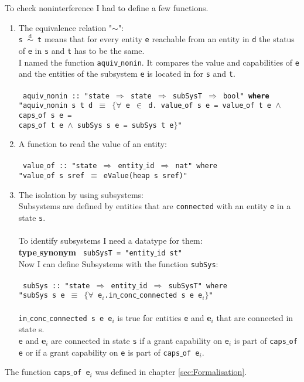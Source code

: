 To check noninterference I had to define a few functions. \\
	
\begin{enumerate}
	
\item The equivalence relation "$\sim$": \\
\texttt{s $\overset{\text{d}}{\sim}$ t} means that for every entity \texttt{e} reachable from an entity in \texttt{d} the status of \texttt{e} in \texttt{s} and \texttt{t} has to be the same. \\

I named the function \texttt{aquiv$\_$nonin}. It compares the value and capabilities of \texttt{e} and the entities of the subsystem \texttt{e} is located in for \texttt{s} and \texttt{t}. \\ \\
{
\texttt{
aquiv$\_$nonin :: "state $\Rightarrow$ state $\Rightarrow$ subSysT $\Rightarrow$ bool" \textbf{where} \\
"aquiv$\_$nonin s t d $\equiv$ $\{\forall$ e $\in$ d. value$\_$of s e = value$\_$of t e $\wedge$ caps$\_$of s e = \\
 caps$\_$of t e $\wedge$ subSys s e = subSys t e$\}$"}} \\

\item A function to read the value of an entity: \\ \\
{
\texttt{
value$\_$of :: "state $\Rightarrow$ entity$\_$id $\Rightarrow$ nat" where \\
"value$\_$of s sref $\equiv$ eValue(heap s sref)"}} \\

\item The isolation by using subsystems: \\
Subsystems are defined by entities that are \texttt{connected} with an entity \texttt{e} in a state \texttt{s}. \\ \\
To identify subsystems I need a datatype for them: \\ 

{\textbf{type$\_$synonym}
\texttt{
subSysT = "entity$\_$id st"}} \\ 

Now I can define Subsystems with the function \texttt{subSys}: \\ \\
{
\texttt{
subSys :: "state $\Rightarrow$ entity$\_$id $\Rightarrow$ subSysT" where \\ 
"subSys s e $\equiv$ $\{\forall$ e$_i$.in$\_$conc$\_$connected s e e$_i\}$"}} \\ \\
\texttt{in$\_$conc$\_$connected s e e$_i$} is true for entities \texttt{e} and \textbf{e$_i$} that are connected in state s. \\
\texttt{e} and \textbf{e$_i$} are connected in state \texttt{s} if a grant capability on \texttt{e$_i$} is part of \texttt{caps$\_$of e} or if a grant capability on \texttt{e} is part of \texttt{caps$\_$of e$_i$}.
\end{enumerate} 

The function \texttt{caps$\_$of e$_i$} was defined in chapter \ref{sec:Formalisation}. 